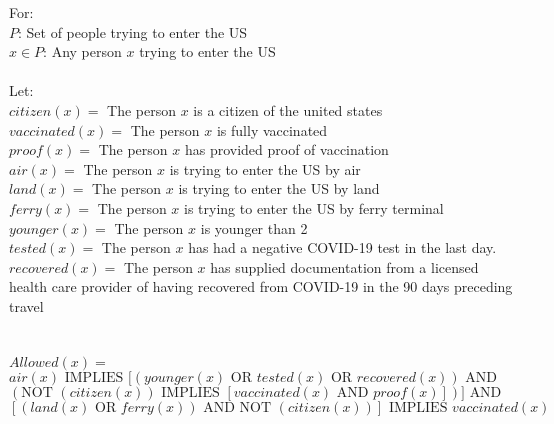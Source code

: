 \documentclass[11pt]{article}
\newcommand{\Implies}{\mbox{ IMPLIES }}
\newcommand{\Or}{\mbox{ OR }}
\renewcommand{\And}{\mbox{ AND }}
\newcommand{\Not}{\mbox{NOT }}
\begin{document}
\begin{enumerate}
\begin{solution}
For:
\\$P$: Set of people trying to enter the US
\\$x\in P$: Any person $x$ trying to enter the US
\\
\\
Let:
\\$citizen(x) =$ The person $x$ is a citizen of the united states
\\$vaccinated(x)=$ The person $x$ is fully vaccinated
\\$proof(x)=$ The person $x$ has provided proof of vaccination
\\$air(x)=$ The person $x$ is trying to enter the US by air
\\$land(x)=$ The person $x$ is trying to enter the US by land
\\$ferry(x)=$ The person $x$ is trying to enter the US by ferry terminal
\\$younger(x)=$ The person $x$ is younger than 2
\\$tested(x)=$ The person $x$ has had a negative COVID-19 test in the last day.
\\$recovered(x)=$ The person $x$ has supplied documentation from a licensed health care provider of having recovered from COVID-19 in the 90 days preceding travel
\\\\\\$Allowed(x)= $
$air(x)\Implies [(younger(x)\Or tested(x) \Or recovered(x)) \And$\\
$(\Not(citizen(x)) \Implies [vaccinated(x)\And proof(x)])]\And$\\
$\left[ (land(x)\Or ferry(x))\And \Not( citizen(x) ) \right] \Implies vaccinated(x)$\\\\



\end{solution}
\end{enumerate}
\end{document}
